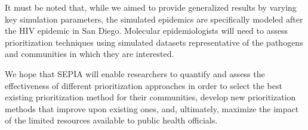 \documentclass[twocolumn]{bmcart}%
\def\texttt{[image: ]}
\begin{document}
It must be noted that, while we aimed to provide generalized results by varying key simulation parameters, the simulated epidemics are specifically modeled after the HIV epidemic in San Diego. Molecular epidemiologists will need to assess prioritization techniques using simulated datasets representative of the pathogens and communities in which they are interested.

We hope that SEPIA will enable researchers to quantify and assess the effectiveness of different prioritization approaches in order to select the best existing prioritization method for their communities, develop new prioritization methods that improve upon existing ones, and, ultimately, maximize the impact of the limited resources available to public health officials.




\end{document}
